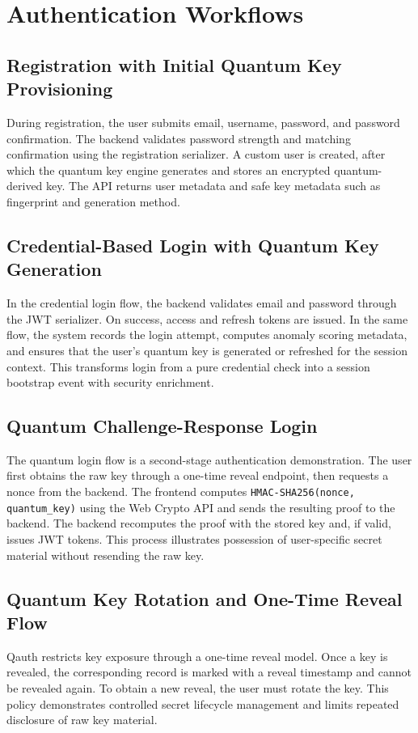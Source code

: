 \documentclass[12pt,a4paper]{report}
\begin{document}
\section{Authentication Workflows}

\subsection{Registration with Initial Quantum Key Provisioning}
During registration, the user submits email, username, password, and password confirmation. The backend validates password strength and matching confirmation using the registration serializer. A custom user is created, after which the quantum key engine generates and stores an encrypted quantum-derived key. The API returns user metadata and safe key metadata such as fingerprint and generation method.

\subsection{Credential-Based Login with Quantum Key Generation}
In the credential login flow, the backend validates email and password through the JWT serializer. On success, access and refresh tokens are issued. In the same flow, the system records the login attempt, computes anomaly scoring metadata, and ensures that the user's quantum key is generated or refreshed for the session context. This transforms login from a pure credential check into a session bootstrap event with security enrichment.

\subsection{Quantum Challenge-Response Login}
The quantum login flow is a second-stage authentication demonstration. The user first obtains the raw key through a one-time reveal endpoint, then requests a nonce from the backend. The frontend computes \texttt{HMAC-SHA256(nonce, quantum\_key)} using the Web Crypto API and sends the resulting proof to the backend. The backend recomputes the proof with the stored key and, if valid, issues JWT tokens. This process illustrates possession of user-specific secret material without resending the raw key.

\subsection{Quantum Key Rotation and One-Time Reveal Flow}
Qauth restricts key exposure through a one-time reveal model. Once a key is revealed, the corresponding record is marked with a reveal timestamp and cannot be revealed again. To obtain a new reveal, the user must rotate the key. This policy demonstrates controlled secret lifecycle management and limits repeated disclosure of raw key material.
\end{document}
